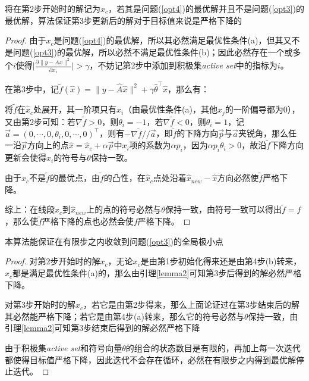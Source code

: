 \begin{lemma}\label{lemma2}
  将在第2步开始时的解记为$x_c$，若其是问题(\ref{opt4})的最优解并且不是问题(\ref{opt3})的最优解，算法保证第3步更新后的解对于目标值来说是严格下降的
\end{lemma}
\begin{proof}
  由于$x_c$是问题(\ref{opt4})的最优解，所以其必然满足最优性条件(a)，但其又不是问题(\ref{opt3})的最优解，所以必然不满足最优性条件(b)；因此必然存在一个或多个$i$使得$\Big|\frac{\partial \|y-Ax\|^2}{\partial x_i}\Big|> \gamma$，不妨记第2步中添加到积极集\emph{active set}中的指标为$i$。

在第3步中，记$\tilde{f}(\hat{x})=\|y-\hat{A}\hat{x}\| ^2+\gamma\hat{\theta}^{\top}\hat{x}$，那么有：

\begin{compactenum}
\item 将$\tilde{f}$在$\hat{x}_c$处展开，其一阶项只有$x_i$（由最优性条件(a)，其他$x_j$的一阶偏导都为0），又由第2步可知：若$\nabla \tilde{f}>0$，则$\theta_i=-1$，若$\nabla \tilde{f}<0$，则$\theta_i=1$，记$\vec{a}=(0,\cdots,0,\theta_i,0,\cdots,0)^{\top}$，则有$-\nabla \tilde{f}//\vec{a}$，即$\tilde{f}$的下降方向$\vec{p}$与$\vec{a}$夹锐角，那么任一沿$\vec{p}$方向上的点$\hat{x}=\hat{x}_c+\alpha\vec{p}$中$x_i$项的系数为$\alpha p_i$，因为$\alpha p_i\theta_i>0$，故沿$\tilde{f}$下降方向更新会使得$\hat{x}_i$的符号与$\theta$保持一致。
\item 由于$\hat{x}_c$不是$\tilde{f}$的最优点，由$\tilde{f}$的凸性，在$\hat{x}_c$点处沿着$\hat{x}_{new}-\hat{x}$方向必然使$\tilde{f}$严格下降。
\end{compactenum}

综上：在线段$\hat{x}_c$到$\hat{x}_{new}$上的点的符号必然与$\theta$保持一致，由符号一致可以得出$\tilde{f}=f$，那么使$\tilde{f}$严格下降的点也必然会使$f$严格下降。
\end{proof}

\begin{lemma}\label{lemma3}
  本算法能保证在有限步之内收敛到问题(\ref{opt3})的全局极小点
\end{lemma}

\begin{proof}
  对第2步开始时的解$x_c$，无论$x_c$是由第1步初始化得来还是由第4步(b)转来，$x_c$都是满足最优性条件(a)的，那么由引理\ref{lemma2}可知第3步后得到的解必然严格下降。

对第3步开始时的解$x_c$，若它是由第2步得来，那么上面论证过在第3步结束后的解其必然能严格下降；若它是由第4步(a)转来，那么它的符号必然与$\theta$保持一致，由引理\ref{lemma2}可知第3步结束后得到的解必然严格下降

由于积极集\emph{active set}和符号向量$\theta$的组合的状态数目是有限的，再加上每一次迭代都使得目标值严格下降，因此迭代不会存在循环，必然在有限步之内得到最优解停止迭代。
\end{proof}

